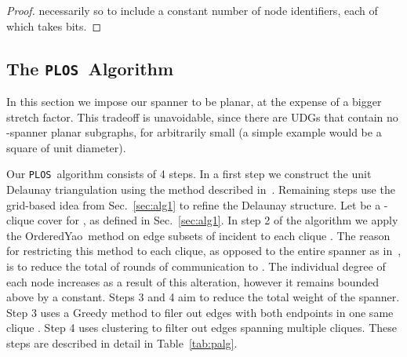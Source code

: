 \documentclass{llncs}
\newcommand{\ABox}{
\raisebox{3pt}{\framebox[6pt]{\rule{6pt}{0pt}}}
}
\newcommand{\palg}{{\tt PLOS}}
\newcommand{\oyao}{{\sc OrderedYao}}
\begin{document}
\begin{proof}
necessarily so to include a constant number of node identifiers, each of which takes  bits.
\hfill\ABox
\end{proof}

\subsection{The \palg\ Algorithm}
\label{sec:alg2}
In this section we impose our spanner to be planar, at the expense of a
bigger stretch factor. This tradeoff is unavoidable, since there are UDGs
that contain no -spanner planar subgraphs, for arbitrarily small 
(a simple example would be a square of unit diameter).

Our \palg\ algorithm consists of 4 steps. In a first step we construct
the unit Delaunay triangulation  using the method described
in~\cite{LCWW03}. Remaining steps use the grid-based idea from Sec.~\ref{sec:alg1}
to refine the Delaunay structure.
Let  be a -clique cover for , as
defined in Sec.~\ref{sec:alg1}.
In step 2 of the algorithm we apply the \oyao\ method
on edge subsets of  incident to each clique . The reason for restricting
this method to each clique, as opposed to the entire spanner  as
in~\cite{WangLi03}, is
to reduce the total of  rounds of communication to . The individual
degree of each node increases as a result of this alteration, however it remains
bounded above by a constant.
Steps 3 and 4 aim to reduce the total weight of the spanner. Step 3 uses
a Greedy method to filer out edges with both endpoints in one same clique .
Step 4 uses clustering to filter out edges spanning multiple cliques.
These steps are described in detail in Table~\ref{tab:palg}.
\end{document}
